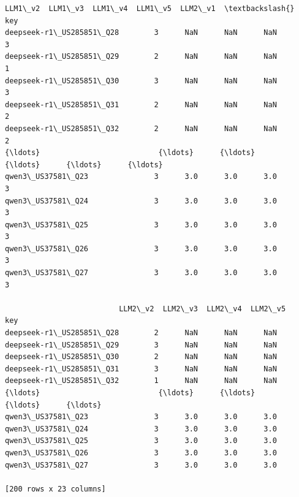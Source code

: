 \documentclass[11pt]{article}
\begin{document}
\begin{tcolorbox}[breakable, size=fbox, boxrule=.5pt, pad at break*=1mm, opacityfill=0]
\begin{Verbatim}[commandchars=\\\{\}]
                          LLM1\_v2  LLM1\_v3  LLM1\_v4  LLM1\_v5  LLM2\_v1  \textbackslash{}
key
deepseek-r1\_US285851\_Q28        3      NaN      NaN      NaN        3
deepseek-r1\_US285851\_Q29        2      NaN      NaN      NaN        1
deepseek-r1\_US285851\_Q30        3      NaN      NaN      NaN        3
deepseek-r1\_US285851\_Q31        2      NaN      NaN      NaN        2
deepseek-r1\_US285851\_Q32        2      NaN      NaN      NaN        2
{\ldots}                           {\ldots}      {\ldots}      {\ldots}      {\ldots}      {\ldots}
qwen3\_US37581\_Q23               3      3.0      3.0      3.0        3
qwen3\_US37581\_Q24               3      3.0      3.0      3.0        3
qwen3\_US37581\_Q25               3      3.0      3.0      3.0        3
qwen3\_US37581\_Q26               3      3.0      3.0      3.0        3
qwen3\_US37581\_Q27               3      3.0      3.0      3.0        3

                          LLM2\_v2  LLM2\_v3  LLM2\_v4  LLM2\_v5
key
deepseek-r1\_US285851\_Q28        2      NaN      NaN      NaN
deepseek-r1\_US285851\_Q29        3      NaN      NaN      NaN
deepseek-r1\_US285851\_Q30        2      NaN      NaN      NaN
deepseek-r1\_US285851\_Q31        3      NaN      NaN      NaN
deepseek-r1\_US285851\_Q32        1      NaN      NaN      NaN
{\ldots}                           {\ldots}      {\ldots}      {\ldots}      {\ldots}
qwen3\_US37581\_Q23               3      3.0      3.0      3.0
qwen3\_US37581\_Q24               3      3.0      3.0      3.0
qwen3\_US37581\_Q25               3      3.0      3.0      3.0
qwen3\_US37581\_Q26               3      3.0      3.0      3.0
qwen3\_US37581\_Q27               3      3.0      3.0      3.0

[200 rows x 23 columns]
\end{Verbatim}
\end{tcolorbox}
        
    
    
\end{document}
